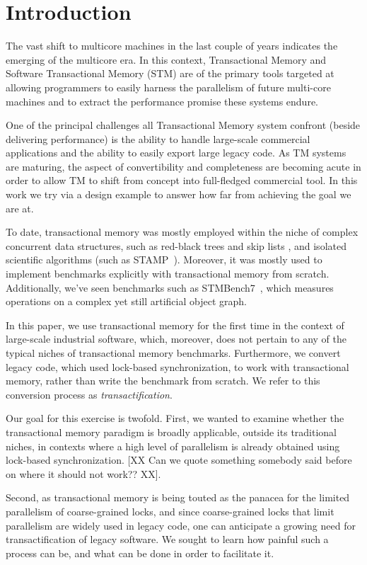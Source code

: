 \documentclass[preprint,11pt]{sigplanconf}
\let \cite = \citep
\begin{document}
\section{Introduction}
The vast shift to multicore machines in the last couple of years indicates the 
emerging of the multicore era. In this context, Transactional Memory and Software Transactional 
Memory (STM) are of the primary tools targeted at allowing programmers to easily harness the 
parallelism of future multi-core machines and to extract the performance promise these systems 
endure. 

One of the principal challenges all Transactional Memory system confront (beside 
delivering performance) is the ability to handle large-scale commercial applications and the 
ability to easily export  large legacy code. As TM systems are maturing, the aspect of 
convertibility and completeness are becoming acute in order to allow TM to shift from concept 
into full-fledged commercial tool. In this work we try via a design example to answer how 
far from achieving the goal we are at. 

To date, transactional memory was mostly employed within the niche of complex
concurrent data structures, such as red-black trees and skip lists
\cite{herlihy:DSTM, fraser:practical:thesis:2003}, and isolated scientific
algorithms (such as STAMP~\cite{caominh:stamp:iiswc:2008}).
Moreover, it was mostly used to implement benchmarks explicitly with
transactional memory from scratch. Additionally, we've seen benchmarks such as
STMBench7~\cite{STMBench7}, which measures operations on a complex yet still
artificial object graph.

In this paper, we use transactional memory
for the first time in the context of large-scale industrial software, which,
moreover, does not pertain to any of the typical niches of transactional memory
benchmarks. Furthermore, we convert legacy code, which used lock-based
synchronization, to work with transactional memory, rather than write the
benchmark from scratch. We refer to this conversion process as
\emph{transactification}.

Our goal for this exercise is twofold. First, we wanted to examine whether the transactional 
memory paradigm is broadly applicable, outside its traditional niches, in contexts where a 
high level of parallelism is already obtained using lock-based synchronization. [XX Can we 
quote something somebody said before on where it should not work?? XX]. 

Second, as transactional memory is being touted as the panacea for the limited parallelism 
of coarse-grained locks, and since coarse-grained locks that limit parallelism are widely used 
in legacy code, one can anticipate a growing need for transactification of legacy software. 
We sought to learn how painful such a process can be, and what can be done in order to 
facilitate it.
\end{document}
